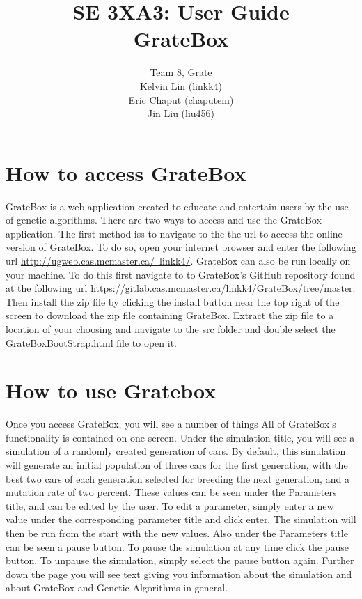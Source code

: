 \documentclass{article}
\title{SE 3XA3: User Guide\\GrateBox}
\author{Team 8, Grate
		\\ Kelvin Lin (linkk4)
		\\ Eric Chaput (chaputem)
		\\ Jin Liu (liu456)
}
\date{}
\begin{document}
\newpage

\maketitle

\section{How to access GrateBox}

GrateBox is a web application created to educate and entertain users by the use 
of genetic algorithms. There are two ways to access and use the GrateBox 
application. The first method iss to navigate to the the url to access the 
online version of GrateBox. To do so, open your internet browser and enter the 
following url 
\href{http://ugweb.cas.mcmaster.ca/~linkk4/}{http://ugweb.cas.mcmaster.ca/~linkk4/}. 
GrateBox can also be run locally on your machine. To do this first navigate to 
to GrateBox's GitHub repository found at the following url 
\href{https://gitlab.cas.mcmaster.ca/linkk4/GrateBox/tree/master}{https://gitlab.cas.mcmaster.ca/linkk4/GrateBox/tree/master}. 
Then install the zip file by clicking the install button near the top right of 
the screen to download the zip file containing GrateBox. Extract the zip file to 
a location of your choosing and navigate to the src folder and double select the 
GrateBoxBootStrap.html file to open it.

\section {How to use Gratebox}

Once you access GrateBox, you will see a number of things All of GrateBox's 
functionality is contained on one screen. Under the simulation title, you will 
see a simulation of a randomly created generation of cars. By default, this 
simulation will generate an initial population of three cars for the first 
generation, with the best two cars of each generation selected for breeding the 
next generation, and a mutation rate of two percent. These values can be seen 
under the Parameters title, and can be edited by the user. To edit a parameter, 
simply enter a new value under the corresponding parameter title and click 
enter. The simulation will then be run from the start with the new values. Also 
under the Parameters title can be seen a pause button. To pause the simulation 
at any time click the pause button. To unpause the simulation, simply select the 
pause button again. Further down the page you will see text giving you 
information about the simulation and about GrateBox and Genetic Algorithms in 
general.
\end{document}

